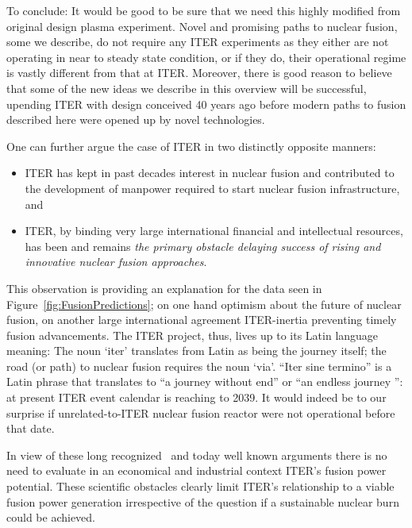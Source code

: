 \documentclass[particles,article,accept,pdftex,moreauthors]{Definitions/mdpi}
\begin{document}
To conclude: It would be good to be sure that we need this highly modified from original design plasma experiment. Novel and promising paths to nuclear fusion, some we describe, do not require any ITER experiments as they either are not operating in near to steady state condition, or if they do, their operational regime is vastly different from that at ITER. Moreover, there is good reason to believe that some of the new ideas we describe in this overview will be successful, upending ITER with design conceived 40 years ago before modern paths to fusion described here were opened up by novel technologies.

One can further argue the case of ITER in two distinctly opposite manners: 
\begin{itemize}
\item ITER has kept in past decades interest in nuclear fusion and contributed to the development of manpower required to start nuclear fusion infrastructure, and 
\item ITER, by binding very large international financial and intellectual resources, has been and remains {\em the primary obstacle delaying success of rising and innovative nuclear fusion approaches}. 
\end{itemize}

This observation is providing an explanation for the data seen in Figure~\ref{fig:FusionPredictions}; on one hand optimism about the future of nuclear fusion, on another large international agreement ITER-inertia preventing timely fusion advancements. The ITER project, thus, lives up to its Latin language meaning: The noun `iter' translates from Latin as being the journey itself; the road (or path) to nuclear fusion requires the noun `via'. ``Iter sine termino'' is a Latin phrase that translates to ``a journey without end'' or ``an endless journey '': at present ITER event calendar is reaching to 2039. It would indeed be to our surprise if unrelated-to-ITER nuclear fusion reactor were not operational before that date.

In view of these long recognized~\cite{lidsky1983trouble} and today well known arguments there is no need to evaluate in an economical and industrial context ITER's fusion power potential. These scientific obstacles  clearly limit ITER's relationship to a viable fusion power generation irrespective of the question if a sustainable nuclear burn could be achieved.

\end{document}
